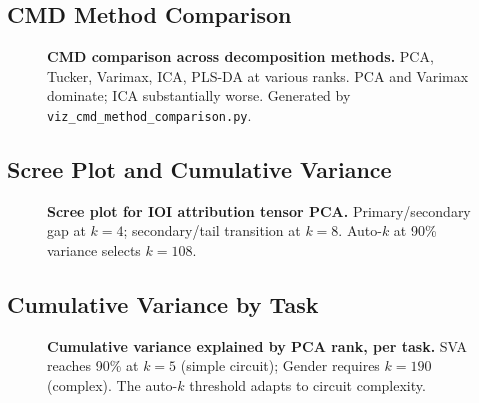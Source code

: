 \documentclass[11pt]{article}
\begin{document}

\subsection{CMD Method Comparison}
\label{fig:cmd_comparison}

\begin{figure}[h!]
\centering
\caption{\textbf{CMD comparison across decomposition methods.} PCA,
Tucker, Varimax, ICA, PLS-DA at various ranks. PCA and Varimax
dominate; ICA substantially worse. Generated by
\texttt{viz\_cmd\_method\_comparison.py}.}
\end{figure}


\subsection{Scree Plot and Cumulative Variance}
\label{fig:scree}

\begin{figure}[h!]
\centering
\caption{\textbf{Scree plot for IOI attribution tensor PCA.}
Primary/secondary gap at $k=4$; secondary/tail transition at $k=8$.
Auto-$k$ at 90\% variance selects $k=108$.}
\end{figure}


\subsection{Cumulative Variance by Task}
\label{fig:cumvar_task}

\begin{figure}[h!]
\centering
\caption{\textbf{Cumulative variance explained by PCA rank, per task.}
SVA reaches 90\% at $k=5$ (simple circuit); Gender requires $k=190$
(complex). The auto-$k$ threshold adapts to circuit complexity.}
\end{figure}
\end{document}
